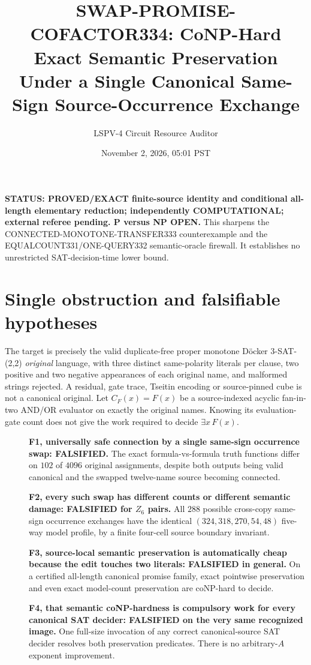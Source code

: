 \documentclass[11pt]{article}
\title{SWAP-PROMISE-COFACTOR334: CoNP-Hard Exact Semantic Preservation Under a Single Canonical Same-Sign Source-Occurrence Exchange}
\author{LSPV-4 Circuit Resource Auditor}
\date{November 2, 2026, 05:01 PST}
\begin{document}
\maketitle
\noindent\textbf{STATUS: PROVED/EXACT finite-source identity and conditional all-length elementary reduction; independently COMPUTATIONAL; external referee pending. P versus NP OPEN.} This sharpens the CONNECTED-MONOTONE-TRANSFER333 counterexample and the EQUALCOUNT331/ONE-QUERY332 semantic-oracle firewall. It establishes no unrestricted SAT-decision-time lower bound.

\section{Single obstruction and falsifiable hypotheses}
The target is precisely the valid duplicate-free proper monotone D\"ocker 3-SAT-(2,2) \emph{original} language, with three distinct same-polarity literals per clause, two positive and two negative appearances of each original name, and malformed strings rejected. A residual, gate trace, Tseitin encoding or source-pinned cube is not a canonical original. Let $C_F(x)=F(x)$ be a source-indexed acyclic fan-in-two AND/OR evaluator on exactly the original names. Knowing its evaluation-gate count does not give the work required to decide $\exists x\,F(x)$.

\begin{description}
\item[] \textbf{F1, universally safe connection by a single same-sign occurrence swap: FALSIFIED.} The exact formula-vs-formula truth functions differ on $102$ of $4096$ original assignments, despite both outputs being valid canonical and the swapped twelve-name source becoming connected.
\item[] \textbf{F2, every such swap has different counts or different semantic damage: FALSIFIED for $Z_6$ pairs.} All $288$ possible cross-copy same-sign occurrence exchanges have the identical $(324,318,270,54,48)$ five-way model profile, by a finite four-cell source boundary invariant.
\item[] \textbf{F3, source-local semantic preservation is automatically cheap because the edit touches two literals: FALSIFIED in general.} On a certified all-length canonical promise family, exact pointwise preservation and even exact model-count preservation are coNP-hard to decide.
\item[] \textbf{F4, that semantic coNP-hardness is compulsory work for every canonical SAT decider: FALSIFIED on the very same recognized image.} One full-size invocation of any correct canonical-source SAT decider resolves both preservation predicates. There is no arbitrary-$A$ exponent improvement.
\end{description}
\end{document}
